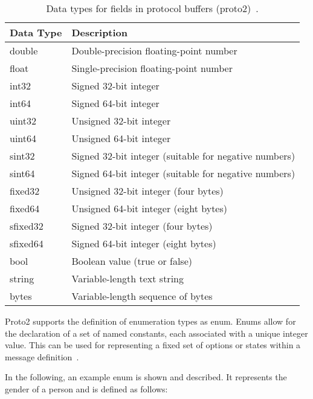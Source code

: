\documentclass[../MasterThesis.tex]{subfiles}
\begin{document}
\begin{description}[font=\normalfont\color{RedViolet!80!black}, style=nextline]
\begin{table}[H]
	\centering
	\begin{tabular}{ll}
		\toprule
		\textbf{Data Type} & \textbf{Description} \\
		\midrule
		double & Double-precision floating-point number \\
		float & Single-precision floating-point number \\
		int32 & Signed 32-bit integer \\
		int64 & Signed 64-bit integer \\
		uint32 & Unsigned 32-bit integer \\
		uint64 & Unsigned 64-bit integer \\
		sint32 & Signed 32-bit integer (suitable for negative numbers) \\
		sint64 & Signed 64-bit integer (suitable for negative numbers) \\
		fixed32 & Unsigned 32-bit integer (four bytes) \\
		fixed64 & Unsigned 64-bit integer (eight bytes) \\
		sfixed32 & Signed 32-bit integer (four bytes) \\
		sfixed64 & Signed 64-bit integer (eight bytes) \\
		bool & Boolean value (true or false) \\
		string & Variable-length text string \\
		bytes & Variable-length sequence of bytes \\
		\bottomrule
	\end{tabular}
	\caption[Data types for fields in protocol buffers (proto2).]{Data types for fields in protocol buffers (proto2)~\cite{proto2_doc}.}
	\label{table:proto2_data_types}
\end{table}




\item[Enums] 

Proto2 supports the definition of enumeration types as enum.
Enums allow for the declaration of a set of named constants, each associated with a unique integer value.
This can be used for representing a fixed set of options or states within a message definition~\cite{protobuffer, proto2_doc}.

In the following, an example enum is shown and described. 
It represents the gender of a person and is defined as follows:


\end{description}
\end{document}
